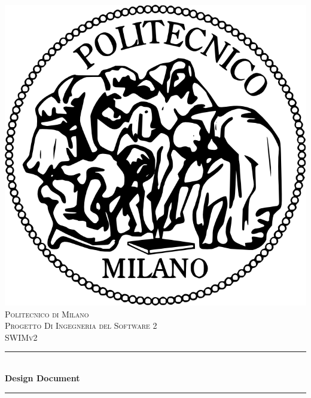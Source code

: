 \begin{titlepage}

\newcommand{\HRule}{\rule{\linewidth}{0.5mm}} %

\center %
\includegraphics[scale=0.22]{polimi.png} \\[2\baselineskip] 
 

\textsc{\LARGE Politecnico di Milano}\\[1cm] %
\textsc{\Large Progetto Di Ingegneria del Software 2}\\[0.5cm] %
\textsc{\large SWIMv2}\\[0.5cm] %


\HRule \\[0.4cm]
{ \huge \bfseries Design Document}\\[0.3cm] %
\HRule \\[1cm]
 

\end{titlepage}
